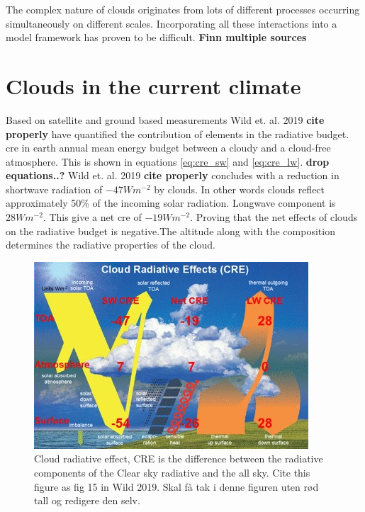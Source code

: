 The complex nature of clouds originates from lots of different processes occurring simultaneously on different scales. Incorporating all these interactions into a model framework has proven to be difficult. \textbf{Finn multiple sources} 

\section{Clouds in the current climate} \label{sec:intro_cloud_current_climate}
Based on satellite and ground based measurements Wild et. al. 2019 \textbf{cite properly} have quantified the contribution of elements in the radiative budget. \acrfull{cre} in earth annual mean energy budget between a cloudy and a cloud-free atmosphere. This is shown in equations \eqref{eq:cre_sw} and \eqref{eq:cre_lw}.  \textbf{drop equations..?}
Wild et. al. 2019 \textbf{cite properly} concludes with a reduction in shortwave radiation of $-47Wm^{-2}$ by clouds. In other words clouds reflect approximately 50\% of the incoming solar radiation. Longwave component is $28Wm^{-2}$. This give a net \acrshort{cre} of $-19Wm^{-2}$. Proving that the net effects of clouds on the radiative budget is negative.The altitude along with the composition determines the radiative properties of the cloud. 

\begin{figure}[h]
    \centering
    \includegraphics[scale = 7]{Chapter1_Intro/images/CRE_wild2019.jpg}
    \caption{Cloud radiative effect, CRE is the difference between the radiative components of the Clear sky radiative and the all sky. Cite this figure as fig 15 in Wild 2019. Skal få tak i denne figuren uten rød tall og redigere den selv.}
    \label{fig:cre}
\end{figure}

